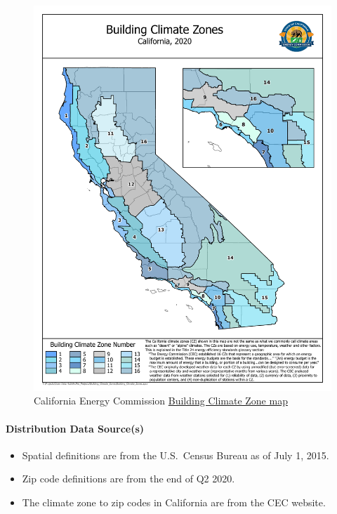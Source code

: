 \begin{figure}
    \centering
    \includegraphics[width=1\linewidth]{images/CEC_Building_Climate_Zones.pdf}
    \caption{California Energy Commission \href{https://cecgis-caenergy.opendata.arcgis.com/documents/CAEnergy::building-climate-zones/explore}{Building Climate Zone map}}
    \label{fig:cec_cz}
\end{figure}

\paragraph{Distribution Data Source(s)}
\begin{itemize}
    \item Spatial definitions are from the U.S.~Census Bureau as of July 1, 2015.
    \item Zip code definitions are from the end of Q2 2020.
    \item The climate zone to zip codes in California are from the CEC website.
\end{itemize}

